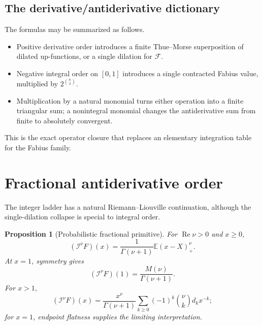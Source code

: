 \documentclass[11pt,oneside]{article}
\newtheorem{proposition}[theorem]{Proposition}
\theoremstyle{definition}
\theoremstyle{remark}
\newcommand{\Fs}{\mathcal F}
\newcommand{\E}{\mathbb E}
\newcommand{\RL}{\mathcal I}
\newcommand{\1}{\mathbf 1}
\DeclareMathOperator{\Rea}{Re}
\begin{document}
\subsection{The derivative/antiderivative dictionary}
The formulas may be summarized as follows.
\begin{itemize}
\item Positive derivative order introduces a finite Thue--Morse superposition
      of dilated up-functions, or a single dilation for \(\Fs\).
\item Negative integral order on \([0,1]\) introduces a single contracted
      Fabius value, multiplied by \(2^{\binom n2}\).
\item Multiplication by a natural monomial turns either operation into a finite
      triangular sum; a nonintegral monomial changes the antiderivative sum
      from finite to absolutely convergent.
\end{itemize}
This is the exact operator closure that replaces an elementary integration
table for the Fabius family.

\section{Fractional antiderivative order}

The integer ladder has a natural Riemann--Liouville continuation, although the
single-dilation collapse is special to integral order.

\begin{proposition}[Probabilistic fractional primitive]\label{prop:fractional-F}
For \(\Rea\nu>0\) and \(x\geq0\),
\begin{equation}
 \boxed{\quad
 (\RL^\nu F)(x)=\frac1{\Gamma(\nu+1)}\E (x-X)_+^\nu.
 \quad}                                                        \label{eq:fractional-stoploss}
\end{equation}
At \(x=1\), symmetry gives
\begin{equation}
 (\RL^\nu F)(1)=\frac{M(\nu)}{\Gamma(\nu+1)}.                  \label{eq:fractional-one}
\end{equation}
For \(x>1\),
\begin{equation}
 (\RL^\nu F)(x)=\frac{x^\nu}{\Gamma(\nu+1)}
 \sum_{k\geq0}(-1)^k\binom\nu k d_kx^{-k};                    \label{eq:fractional-exterior}
\end{equation}
for \(x=1\), endpoint flatness supplies the limiting interpretation.
\end{proposition}
\end{document}
